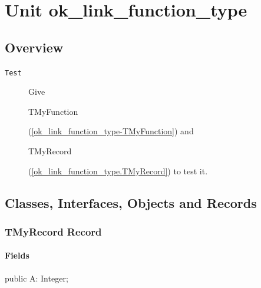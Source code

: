 \documentclass{report}
\newif\ifpdf
\begin{document}
\label{toc}\tableofcontents
\newpage
\newlength{\tmplength}
\chapter{Unit ok{\_}link{\_}function{\_}type}
\label{ok_link_function_type}
\section{Overview}
\begin{description}
\item[\texttt{\begin{ttfamily}TMyRecord\end{ttfamily} Record}]
\end{description}
\begin{description}
\item[\texttt{Test}]Give \begin{ttfamily}TMyFunction\end{ttfamily}(\ref{ok_link_function_type-TMyFunction}) and \begin{ttfamily}TMyRecord\end{ttfamily}(\ref{ok_link_function_type.TMyRecord}) to test it.
\end{description}
\section{Classes, Interfaces, Objects and Records}
\ifpdf
\subsection*{\large{\textbf{TMyRecord Record}}\normalsize\hspace{1ex}\hrulefill}
\else
\subsection*{TMyRecord Record}
\fi
\label{ok_link_function_type.TMyRecord}
\subsubsection*{\large{\textbf{Fields}}\normalsize\hspace{1ex}\hfill}
\begin{list}{}{
\setlength{\itemindent}{0cm}
\setlength{\listparindent}{0cm}
\setlength{\leftmargin}{\evensidemargin}
\addtolength{\leftmargin}{\tmplength}
\settowidth{\labelsep}{X}
\addtolength{\leftmargin}{\labelsep}
\setlength{\labelwidth}{\tmplength}
}
\label{ok_link_function_type.TMyRecord-A}
\item[\textbf{A}\hfill]
\ifpdf
\begin{flushleft}
\fi
\begin{ttfamily}
public A: Integer;\end{ttfamily}

\ifpdf
\end{flushleft}
\fi


\par  \end{list}
\end{document}
